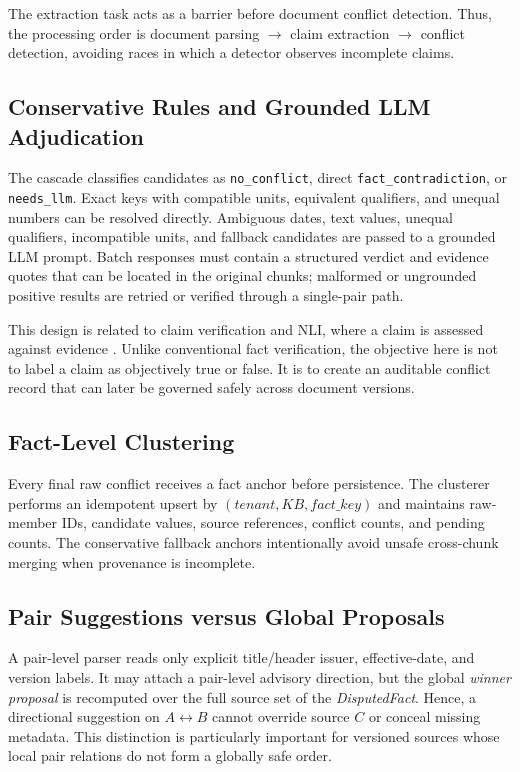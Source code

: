 \documentclass[conference]{IEEEtran}
\newcommand{\disputedfact}{\textit{DisputedFact}}
\newcommand{\proposal}{\textit{winner proposal}}
\begin{document}
The extraction task acts as a barrier before document conflict detection. Thus, the processing order is document parsing $\rightarrow$ claim extraction $\rightarrow$ conflict detection, avoiding races in which a detector observes incomplete claims.

\subsection{Conservative Rules and Grounded LLM Adjudication}

The cascade classifies candidates as \texttt{no\_conflict}, direct \texttt{fact\_contradiction}, or \texttt{needs\_llm}. Exact keys with compatible units, equivalent qualifiers, and unequal numbers can be resolved directly. Ambiguous dates, text values, unequal qualifiers, incompatible units, and fallback candidates are passed to a grounded LLM prompt. Batch responses must contain a structured verdict and evidence quotes that can be located in the original chunks; malformed or ungrounded positive results are retried or verified through a single-pair path.

This design is related to claim verification and NLI, where a claim is assessed against evidence \cite{thorne2018fever,wadden2020scifact,bowman2015snli,williams2018multinli}. Unlike conventional fact verification, the objective here is not to label a claim as objectively true or false. It is to create an auditable conflict record that can later be governed safely across document versions.

\subsection{Fact-Level Clustering}

Every final raw conflict receives a fact anchor before persistence. The clusterer performs an idempotent upsert by $(tenant,KB,fact\_key)$ and maintains raw-member IDs, candidate values, source references, conflict counts, and pending counts. The conservative fallback anchors intentionally avoid unsafe cross-chunk merging when provenance is incomplete.

\subsection{Pair Suggestions versus Global Proposals}

A pair-level parser reads only explicit title/header issuer, effective-date, and version labels. It may attach a pair-level advisory direction, but the global \proposal{} is recomputed over the full source set of the \disputedfact{}. Hence, a directional suggestion on $A\leftrightarrow B$ cannot override source $C$ or conceal missing metadata. This distinction is particularly important for versioned sources whose local pair relations do not form a globally safe order.
\end{document}
